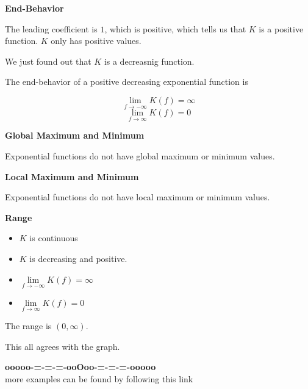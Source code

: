 \documentclass{ximera}
\begin{document}
\begin{example}
\textbf{End-Behavior}


The leading coefficient is $1$, which is positive, which tells us that $K$ is a positive function. $K$ only has positive values.

We just found out that $K$ is a decreasnig function.

The end-behavior of a positive decreasing exponential function is


\[ \lim\limits_{f \to -\infty} K(f) = \infty \]
\[ \lim\limits_{f \to \infty} K(f) = 0 \]







\textbf{Global Maximum and Minimum}

Exponential functions do not have global maximum or minimum values.





\textbf{Local Maximum and Minimum}

Exponential functions do not have local maximum or minimum values.



\textbf{Range}

\begin{itemize}
\item $K$ is continuous
\item $K$ is decreasing and positive.
\item $\lim\limits_{f \to -\infty} K(f) = \infty $
\item $\lim\limits_{f \to \infty} K(f) = 0$
\end{itemize}


The range is $(0, \infty)$. 







This all agrees with the graph. 


\end{example}












\begin{center}
\textbf{\textcolor{green!50!black}{ooooo-=-=-=-ooOoo-=-=-=-ooooo}} \\

more examples can be found by following this link\\ 

\end{center}
\end{document}
